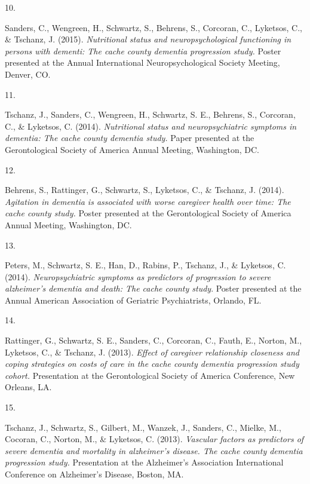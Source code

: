 \documentclass[11pt,a4paper,]{moderncv}
\newlength{\csllabelwidth}
\newcommand{\CSLLeftMargin}[1]{\parbox[t]{\csllabelwidth}{#1}}
\newcommand{\CSLRightInline}[1]{\parbox[t]{\linewidth - \csllabelwidth}{#1}}
\begin{document}
\leavevmode{}%
\CSLLeftMargin{10. }
\CSLRightInline{Sanders, C., Wengreen, H., Schwartz, S., Behrens, S.,
Corcoran, C., Lyketsos, C., \& Tschanz, J. (2015). \emph{Nutritional
status and neuropsychological functioning in persons with dementi: The
cache county dementia progression study.} Poster presented at the Annual
International Neuropsychological Society Meeting, Denver, CO.}

\leavevmode{}%
\CSLLeftMargin{11. }
\CSLRightInline{Tschanz, J., Sanders, C., Wengreen, H., Schwartz, S. E.,
Behrens, S., Corcoran, C., \& Lyketsos, C. (2014). \emph{Nutritional
status and neuropsychiatric symptoms in dementia: The cache county
dementia study.} Paper presented at the Gerontological Society of
America Annual Meeting, Washington, DC.}

\leavevmode{}%
\CSLLeftMargin{12. }
\CSLRightInline{Behrens, S., Rattinger, G., Schwartz, S., Lyketsos, C.,
\& Tschanz, J. (2014). \emph{Agitation in dementia is associated with
worse caregiver health over time: The cache county study.} Poster
presented at the Gerontological Society of America Annual Meeting,
Washington, DC.}

\leavevmode{}%
\CSLLeftMargin{13. }
\CSLRightInline{Peters, M., Schwartz, S. E., Han, D., Rabins, P.,
Tschanz, J., \& Lyketsos, C. (2014). \emph{Neuropsychiatric symptoms as
predictors of progression to severe alzheimer's dementia and death: The
cache county study}. Poster presented at the Annual American Association
of Geriatric Psychiatrists, Orlando, FL.}

\leavevmode{}%
\CSLLeftMargin{14. }
\CSLRightInline{Rattinger, G., Schwartz, S. E., Sanders, C., Corcoran,
C., Fauth, E., Norton, M., Lyketsos, C., \& Tschanz, J. (2013).
\emph{Effect of caregiver relationship closeness and coping strategies
on costs of care in the cache county dementia progression study cohort.}
Presentation at the Gerontological Society of America Conference, New
Orleans, LA.}

\leavevmode{}%
\CSLLeftMargin{15. }
\CSLRightInline{Tschanz, J., Schwartz, S., Gilbert, M., Wanzek, J.,
Sanders, C., Mielke, M., Cocoran, C., Norton, M., \& Lyketsos, C.
(2013). \emph{Vascular factors as predictors of severe dementia and
mortality in alzheimer's disease. The cache county dementia progression
study.} Presentation at the Alzheimer's Association International
Conference on Alzheimer's Disease, Boston, MA.}
\end{document}
